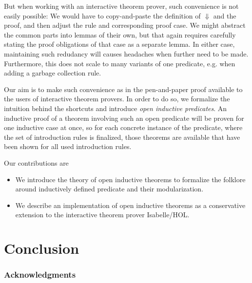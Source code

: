 \documentclass{llncs}
\newcommand{\sRule}[1]{\text{{\textsc{#1}}}}
\begin{document}
But when working with an interactive theorem prover, such convenience is not easily possible: We would have to copy-and-paste the definition of $\Downarrow$ and the proof, and then adjust the rule \sRule{Var} and corresponding proof case. We might abstract the common parts into lemmas of their own, but that again requires carefully stating the proof obligations of that case as a separate lemma. In either case, maintaining such redudancy will causes headaches when further need to be made. Furthermore, this does not scale to many variants of one predicate, e.g. when adding a garbage collection rule.

Our aim is to make such convenience as in the pen-and-paper proof available to the users of interactive theorem provers. In order to do so, we formalize the intuition behind the shortcuts and introduce \emph{open inductive predicates}. An inductive proof of a theorem involving such an open predicate will be proven for one inductive case at once, so for each concrete instance of the predicate, where the set of introduction rules is finalized, those theorems are available that have been shown for all used introduction rules.

\noindent Our contributions are
\begin{itemize}
\item We introduce the theory of open inductive theorems to formalize the folklore around inductively defined predicate and their modularization.
\item We describe an implementation of open inductive theorems as a conservative extension to the interactive theorem prover Isabelle/HOL.
\end{itemize}



\section{Conclusion}

\subsubsection*{Acknowledgments}



\end{document}
